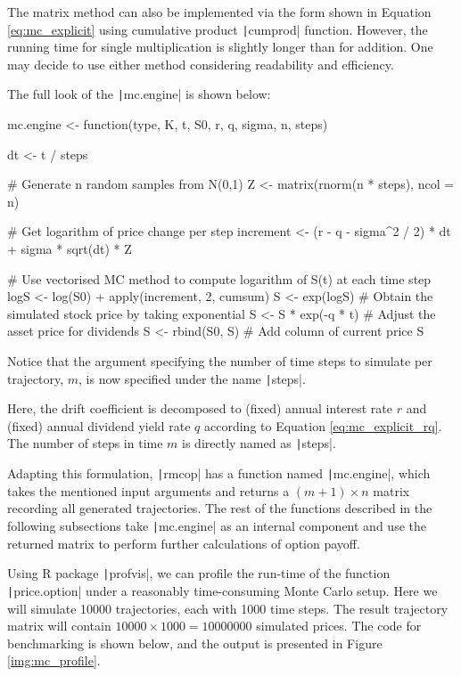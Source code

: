 The matrix method can also be implemented via the form shown in Equation \ref{eq:mc_explicit} using cumulative product \texttt|cumprod| function. However, the running time for single multiplication is slightly longer than for addition. One may decide to use either method considering readability and efficiency.

The full look of the \texttt|mc.engine| is shown below:

\begin{Rminted}
mc.engine <- function(type, K, t, S0, r, q, sigma, n, steps) {

    dt <- t / steps

    # Generate n random samples from N(0,1)
    Z <- matrix(rnorm(n * steps), ncol = n)

    # Get logarithm of price change per step
    increment <- (r - q - sigma^2 / 2) * dt + sigma * sqrt(dt) * Z

    # Use vectorised MC method to compute logarithm of S(t) at each time step
    logS <- log(S0) + apply(increment, 2, cumsum)
    S <- exp(logS) # Obtain the simulated stock price by taking exponential
    S <- S * exp(-q * t) # Adjust the asset price for dividends
    S <- rbind(S0, S) # Add column of current price
    S
}
\end{Rminted}

Notice that the argument specifying the number of time steps to simulate per trajectory, $m$, is now specified under the name \texttt|steps|.

Here, the drift coefficient is decomposed to (fixed) annual interest rate $r$ and (fixed) annual dividend yield rate $q$ according to Equation \ref{eq:mc_explicit_rq}. The number of steps in time $m$ is directly named as \texttt|steps|.

Adapting this formulation, \texttt|rmcop| has a function named \texttt|mc.engine|, which takes the mentioned input arguments and returns a $(m+1)\times n$ matrix recording all generated trajectories. The rest of the functions described in the following subsections take \texttt|mc.engine| as an internal component and use the returned matrix to perform further calculations of option payoff.

Using R package \texttt|profvis|, we can profile the run-time of the function \texttt|price.option| under a reasonably time-consuming Monte Carlo setup. Here we will simulate 10000 trajectories, each with 1000 time steps. The result trajectory matrix will contain $10000\times1000=10000000$ simulated prices. The code for benchmarking is shown below, and the output is presented in Figure \ref{img:mc_profile}.

